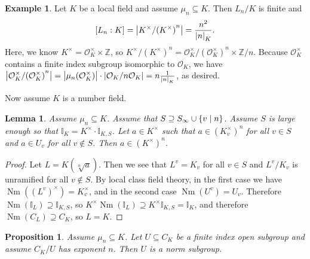 \documentclass[leqno, openany]{memoir}
\newtheorem{prop}[thm]{Proposition}
\newtheorem{lem}[thm]{Lemma}
\theoremstyle{definition}
\newtheorem{exm}[thm]{Example}
\theoremstyle{remark}
\theoremstyle{plain}
\theoremstyle{definition}
\theoremstyle{remark}
\newcommand{\Z}{\mathbb{Z}}
\newcommand{\I}{\mathbb{I}}
\newcommand{\mc}[1]{\mathcal{#1}}
\DeclareMathOperator{\Nm}{Nm}
\begin{document}
\begin{exm} Let $K$ be a local field and assume $\mu_n \subseteq K$. Then
    $L_n/K$ is finite and \[ [L_n:K] = \abs{K^{\times}/{(K^{\times})}^n} =
    \frac{n^2}{\abs{n}_K}. \] Here, we know $K^{\times} = \mc{O}_K^{\times}
    \times \Z$, so $K^{\times}/{(K^{\times})}^n =
    \mc{O}_K^{\times}/{(\mc{O}_K^{\times})}^n \times \Z/n$. Because
    $\mc{O}_K^{\times}$ contains a finite index subgroup isomorphic to
    $\mc{O}_K$, we have $\abs{\mc{O}_K^{\times}/{(\mc{O}_K^{\times})}^n} =
    \abs{\mu_n(\mc{O}_K^{\times})} \cdot \abs{\mc{O}_K/n\mc{O}_K} = n
    \frac{1}{\abs{n}_K}$, as desired.  \end{exm}

Now assume $K$ is a number field. 

\begin{lem} Assume $\mu_n \subseteq K$. Assume that $S \supseteq S_{\infty}
    \cup \qty{v \mid n}$. Assume $S$ is large enough so that $\I_K = K^{\times}
    \cdot \I_{K,S}$. Let $a \in K^{\times}$ such that $a \in { ( K_v^{\times} )
    }^n$ for all $v \in S$ and $a \in U_v$ for all $v \notin S$. Then $a \in
    {(K^{\times})}^n$.  \end{lem}

\begin{proof} Let $L = K(\sqrt[n]{a})$. Then we see that $L^v = K_v$ for all $v
    \in S$ and $L^v/K_v$ is unramified for all $v \notin S$. By local class
    field theory, in the first case we have $\Nm({(L^v)}^{\times}) =
    K_v^{\times}$, and in the second case $\Nm(U^v) = U_v$. Therefore
    $\Nm(\I_L) \supseteq \I_{K,S}$, so $K^{\times} \Nm(\I_L) \supseteq
    K^{\times} \I_{K,S} = \I_K$, and therefore $\Nm(C_L) \supseteq C_K$, so
    $L=K$.  \end{proof}

\begin{prop} Assume $\mu_n \subseteq K$. Let $U \subseteq C_K$ be a finite
index open subgroup and assume $C_K/U$ has exponent $n$. Then $U$ is a norm
subgroup.  \end{prop}
\end{document}
